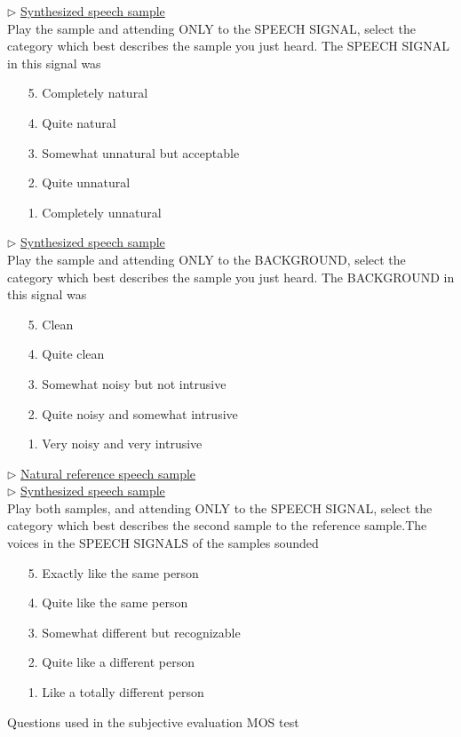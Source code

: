 \begin{table}[!htb]
	\begin{framed}
	$\rhd$ \underline{Synthesized speech sample}\\
	Play the sample and attending ONLY to the SPEECH SIGNAL, select the category which best describes the sample you just heard. The SPEECH SIGNAL in this signal was
	\begin{itemize}
	\item[5.] Completely natural
	\item[4.] Quite natural
	\item[3.] Somewhat unnatural but acceptable
	\item[2.] Quite unnatural
	\item[1.] Completely unnatural
	\end{itemize}
	\end{framed}
	\begin{framed}
	$\rhd$ \underline{Synthesized speech sample}\\
	Play the sample and attending ONLY to the BACKGROUND, select the category which best describes the sample you just heard. The BACKGROUND in this signal was
	\begin{itemize}
	\item[5.] Clean
	\item[4.] Quite clean
	\item[3.] Somewhat noisy but not intrusive
	\item[2.] Quite noisy and somewhat intrusive
	\item[1.] Very noisy and very intrusive
	\end{itemize}
	\end{framed}
	\begin{framed}
	$\rhd$ \underline{Natural reference speech sample}\\
	$\rhd$ \underline{Synthesized speech sample}\\
	Play both samples, and attending ONLY to the SPEECH SIGNAL, select the category which best describes the second sample to the reference sample.The voices in the SPEECH SIGNALS of the samples sounded
	\begin{itemize}
	\item[5.] Exactly like the same person
	\item[4.] Quite like the same person
	\item[3.] Somewhat different but recognizable
	\item[2.]Quite like a different person
	\item[1.] Like a totally different person
	\end{itemize}
	\end{framed}
	\caption{Questions used in the subjective evaluation MOS test}
\label{table:mostest_questions}
\end{table}